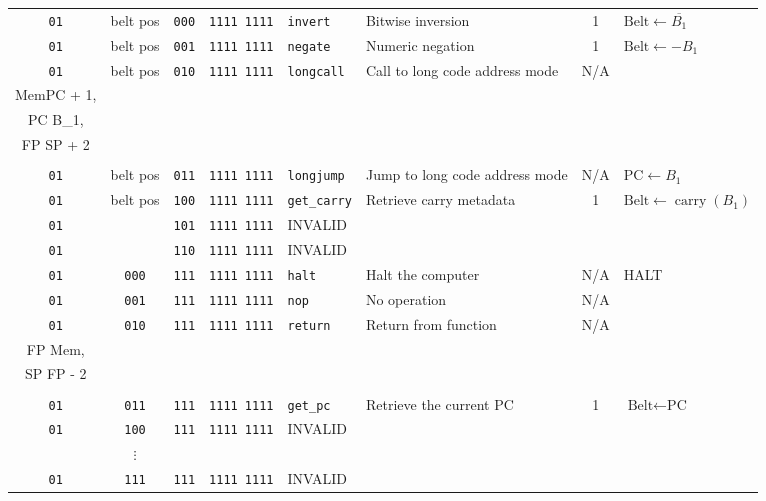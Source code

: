 \documentclass{article}
\begin{document}
\begin{landscape}
\begin{longtable}{c c c c l l c l}
		\texttt{01} & belt pos & \texttt{000} & \texttt{1111 1111} & \texttt{invert}     & Bitwise inversion              & 1   &
			\(\textrm{Belt} \gets \overline{B_1}\) \\
		\texttt{01} & belt pos & \texttt{001} & \texttt{1111 1111} & \texttt{negate}     & Numeric negation               & 1   &
			\(\textrm{Belt} \gets -B_1\) \\
		\texttt{01} & belt pos & \texttt{010} & \texttt{1111 1111} & \texttt{longcall}   & Call to long code address mode & N/A &
			\(\begin{array}{l}
				\textrm{Mem}\left[\textrm{SP}\right] \gets \textrm{FP}, \\
				\textrm{Mem}\left[\textrm{SP} + 1\right] \gets \textrm{PC} + 1, \\
				\textrm{PC} \gets B_1, \\
				\textrm{FP} \gets \textrm{SP} + 2 \\
			\end{array}\) \\
		\texttt{01} & belt pos & \texttt{011} & \texttt{1111 1111} & \texttt{longjump}   & Jump to long code address mode & N/A &
			\(\textrm{PC} \gets B_1\) \\
		\texttt{01} & belt pos & \texttt{100} & \texttt{1111 1111} & \texttt{get\_carry} & Retrieve carry metadata        & 1   &
			\(\textrm{Belt} \gets \operatorname{carry}\left(B_1\right)\) \\
		\texttt{01} & & \texttt{101} & \texttt{1111 1111} & INVALID & \\
		\texttt{01} & & \texttt{110} & \texttt{1111 1111} & INVALID & \\
		\texttt{01} & \texttt{000} & \texttt{111} & \texttt{1111 1111} & \texttt{halt}    & Halt the computer       & N/A & HALT \\
		\texttt{01} & \texttt{001} & \texttt{111} & \texttt{1111 1111} & \texttt{nop}     & No operation            & N/A & \\
		\texttt{01} & \texttt{010} & \texttt{111} & \texttt{1111 1111} & \texttt{return}  & Return from function    & N/A &
			\(\begin{array}{l}
				\textrm{PC} \gets \textrm{Mem}\left[\textrm{FP} - 1\right], \\
				\textrm{FP} \gets \textrm{Mem}\left[\textrm{FP} - 2\right], \\
				\textrm{SP} \gets \textrm{FP} - 2 \\
			\end{array}\) \\
		\texttt{01} & \texttt{011} & \texttt{111} & \texttt{1111 1111} & \texttt{get\_pc} & Retrieve the current PC & 1   &
			\(\textrm{Belt} \gets \textrm{PC}\) \\
		\texttt{01} & \texttt{100} & \texttt{111} & \texttt{1111 1111} & INVALID & \\
		            & \(\vdots\)   &              &                    &         & \\
		\texttt{01} & \texttt{111} & \texttt{111} & \texttt{1111 1111} & INVALID & \\


\end{longtable}
\end{landscape}
\end{document}
